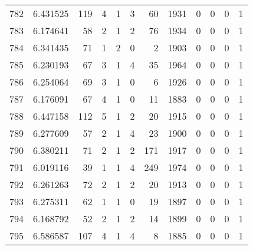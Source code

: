\begin{tabular}{lrrrrrrrrrrr}
782 &  6.431525 &  119 &      4 &        1 &      3 &              60 &  1931 &               0 &               0 &               0 &               1 \\
783 &  6.174641 &   58 &      2 &        1 &      2 &              76 &  1934 &               0 &               0 &               0 &               1 \\
784 &  6.341435 &   71 &      1 &        2 &      0 &               2 &  1903 &               0 &               0 &               0 &               1 \\
785 &  6.230193 &   67 &      3 &        1 &      4 &              35 &  1964 &               0 &               0 &               0 &               1 \\
786 &  6.254064 &   69 &      3 &        1 &      0 &               6 &  1926 &               0 &               0 &               0 &               1 \\
787 &  6.176091 &   67 &      4 &        1 &      0 &              11 &  1883 &               0 &               0 &               0 &               1 \\
788 &  6.447158 &  112 &      5 &        1 &      2 &              20 &  1915 &               0 &               0 &               0 &               1 \\
789 &  6.277609 &   57 &      2 &        1 &      4 &              23 &  1900 &               0 &               0 &               0 &               1 \\
790 &  6.380211 &   71 &      2 &        1 &      2 &             171 &  1917 &               0 &               0 &               0 &               1 \\
791 &  6.019116 &   39 &      1 &        1 &      4 &             249 &  1974 &               0 &               0 &               0 &               1 \\
792 &  6.261263 &   72 &      2 &        1 &      2 &              20 &  1913 &               0 &               0 &               0 &               1 \\
793 &  6.275311 &   62 &      1 &        1 &      0 &              19 &  1897 &               0 &               0 &               0 &               1 \\
794 &  6.168792 &   52 &      2 &        1 &      2 &              14 &  1899 &               0 &               0 &               0 &               1 \\
795 &  6.586587 &  107 &      4 &        1 &      4 &               8 &  1885 &               0 &               0 &               0 &               1 \\

\end{tabular}
